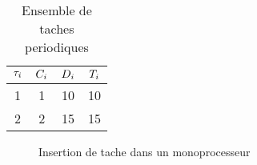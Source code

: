 \begin{table}[!h]
\begin{center}
\begin{tabular}{|c|c|c|c|}
 \hline$\tau_{i}$ & $C_{i}$ & $D_{i}$ & $T_{i}$ \\ 
 \hline 1 & 1 & 10 & 10 \\ 
 \hline 2 & 2 & 15 & 15 \\ 
 \hline 
 \end{tabular}
\end{center}
\caption{Ensemble de taches periodiques} \label{tab:exempledmup}
\end{table}

\begin{figure}[h]
\begin{center}
\begin{RTGrid}[height=4cm,width=12cm,labelsize=8pt,numbersize=6]{3}{31}




\end{RTGrid}
\caption{Insertion de tache dans un monoprocesseur} \label{fig:exempledmup}
\end{center}
\end{figure}

